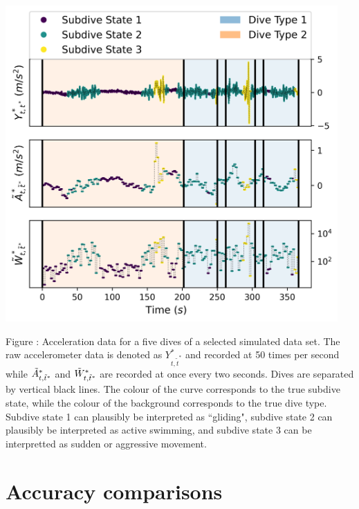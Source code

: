\documentclass{article}
\begin{document}
        \begin{center}
    	\includegraphics[width=5in]{../Plots/sim_data.png}
    	\end{center}
    	
    	\noindent Figure : Acceleration data for a five dives of a selected simulated data set. The raw accelerometer data is denoted as $Y^*_{t,\tilde t^*}$ and recorded at 50 times per second while $\tilde{A}^*_{t,\tilde t^*}$ and $\tilde{W}^*_{t,\tilde t^*}$ are recorded at once every two seconds. Dives are separated by vertical black lines. The colour of the curve corresponds to the true subdive state, while the colour of the background corresponds to the true dive type. Subdive state 1 can plausibly be interpreted as ``gliding", subdive state 2 can plausibly be interpreted as active swimming, and subdive state 3 can be interpretted as sudden or aggressive movement.
    	\addtocounter{fignum}{1}

    \newpage
    \section{Accuracy comparisons}
        
\end{document}
